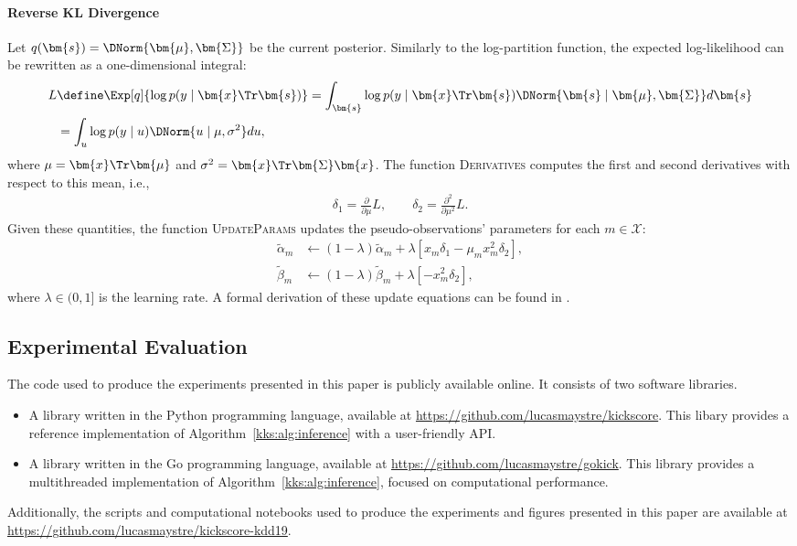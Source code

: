 \paragraph{Reverse KL Divergence}

Let $q(\bm{s}) = \DNorm{\bm{\mu}, \bm{\Sigma}}$ be the current posterior.
Similarly to the log-partition function, the expected log-likelihood can be rewritten as a one-dimensional integral:
\begin{align*}
	L
	 & \define \Exp[q]{ \log p(y \mid \bm{x}\Tr \bm{s}) }
	= \int_{\bm{s}} \log p(y \mid \bm{x}\Tr \bm{s}) \DNorm{\bm{s} \mid \bm{\mu}, \bm{\Sigma}} d\bm{s} \\
	 & = \int_{u} \log p(y \mid u) \DNorm{u \mid \mu, \sigma^2} du,
\end{align*}
where $\mu = \bm{x}\Tr \bm{\mu}$ and $\sigma^2 = \bm{x}\Tr \bm{\Sigma} \bm{x}$.
The function \textsc{Derivatives} computes the first and second derivatives with respect to this mean, i.e.,
\begin{align*}
	\delta_1 = \frac{\partial}{\partial \mu} L, \qquad
	\delta_2 = \frac{\partial^2}{\partial \mu^2} L.
\end{align*}
Given these quantities, the function \textsc{UpdateParams} updates the pseudo-observations' parameters for each $m \in \mathcal{X}$:
\begin{align*}
	\tilde{\alpha}_m & \gets (1 - \lambda) \tilde{\alpha}_m
	+ \lambda \left[ x_m \delta_1 - \mu_m x_m^2 \delta_2 \right], \\
	\tilde{\beta}_m  & \gets (1 - \lambda) \tilde{\beta}_m
	+ \lambda \left[ -x_m^2 \delta_2 \right],
\end{align*}
where $\lambda \in (0, 1]$ is the learning rate.
A formal derivation of these update equations can be found in \citet{khan2017conjugate}.

\subsection{Experimental Evaluation}
\label{kks:app:eval}

The code used to produce the experiments presented in this paper is publicly available online.
It consists of two software libraries.
\begin{itemize}
	\item A library written in the Python programming language, available at \url{https://github.com/lucasmaystre/kickscore}.
	      This libary provides a reference implementation of Algorithm~\ref{kks:alg:inference} with a user-friendly API.

	\item A library written in the Go programming language, available at \url{https://github.com/lucasmaystre/gokick}.
	      This library provides a multithreaded implementation of Algorithm~\ref{kks:alg:inference}, focused on computational performance.
\end{itemize}
Additionally, the scripts and computational notebooks used to produce the experiments and figures presented in this paper are available at \url{https://github.com/lucasmaystre/kickscore-kdd19}.

